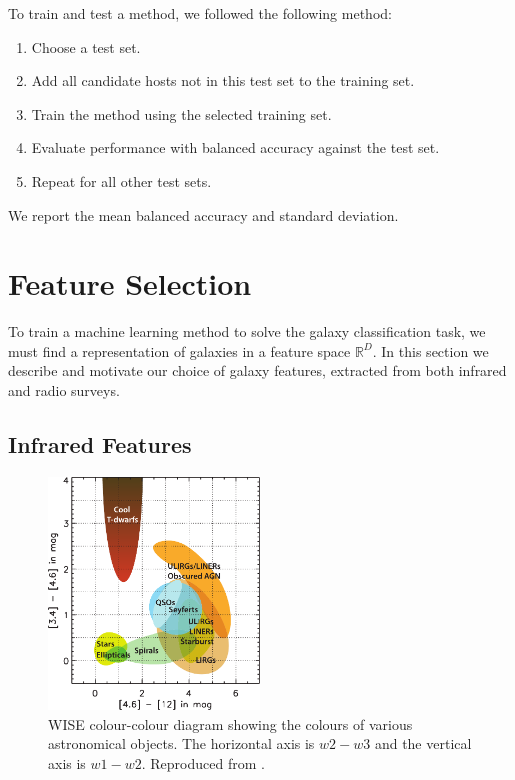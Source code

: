   To train and test a method, we followed the following method:
  \begin{enumerate}
    \item Choose a test set.
    \item Add all candidate hosts not in this test set to the training set.
    \item Train the method using the selected training set.
    \item Evaluate performance with balanced accuracy against the test set.
    \item Repeat for all other test sets.
  \end{enumerate}
  We report the mean balanced accuracy and standard deviation.

\section{Feature Selection}
\label{sec:features}

  To train a machine learning method to solve the galaxy classification task,
  we must find a representation of galaxies in a feature space $\mathbb{R}^D$.
  In this section we describe and motivate our choice of galaxy features,
  extracted from both infrared and radio surveys.

  \subsection{Infrared Features}
  \label{sec:ir-features}

    \begin{figure}
      \centering
      \includegraphics[width=0.5\textwidth]{images/wise_colour-colour}
      \caption{WISE colour-colour diagram showing the colours of various
        astronomical objects. The horizontal axis is $w2 - w3$ and the vertical
        axis is $w1 - w2$. Reproduced from \citep{wright10}.}
      \label{fig:wise-colour-colour}
    \end{figure}

